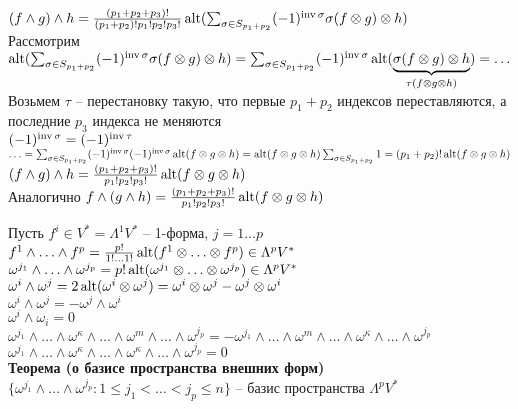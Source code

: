 \documentclass[12pt]{article}
\begin{document}
\begin{enumerate}
    $(f\land g) \land h = \frac{(p_1+p_2+p_3)!}{(p_1+p_2)!p_1!p_2!p_3!}\alt(\sum_{\sigma \in S_{p_1+p_2}} (-1)^{\inv\sigma}\sigma(f\otimes g)\otimes h)$\\
    Рассмотрим $\alt(\sum_{\sigma \in S_{p_1+p_2}} (-1)^{\inv\sigma}\sigma(f\otimes g)\otimes h) = \sum_{\sigma \in S_{p_1+p_2}} (-1)^{\inv\sigma}\alt(\ub{\tau(f\otimes g\otimes h)}{\sigma(f\otimes g)\otimes h}) = \ldots$\\
    Возьмем $\tau$ -- перестановку такую, что первые $p_1+p_2$ индексов переставляются, а последние $p_3$ индекса не меняются\\
    $(-1)^{\inv \sigma} = (-1)^{\inv \tau}$\\
    $\ldots = \sum_{\sigma \in S_{p_1+p_2}} (-1)^{\inv \sigma}(-1)^{\inv \sigma} \alt(f\otimes g \otimes h) = \alt(f\otimes g\otimes h)\sum_{\sigma \in S_{p_1+p_2}} 1 = (p_1+p_2)!\alt(f\otimes g \otimes h)$\\
    $(f\land g) \land h = \frac{(p_1+p_2+p_3)!}{p_1!p_2!p_3!}\alt(f\otimes g \otimes h)$\\
    Аналогично $f \land (g\land h) = \frac{(p_1+p_2+p_3)!}{p_1!p_2!p_3!}\alt(f\otimes g \otimes h)$
\end{enumerate}
Пусть $f^i \in V^* = \Lambda^1V^*$ -- 1-форма, $j = 1\ldots p$\\
$f^1\land \ldots \land f^p = \frac{p!}{1!\ldots1!} \alt(f^1\otimes \ldots \otimes f^p) \in \Lambda^p V^*$\\
$\omega^{j_1}\land \ldots \land \omega^{j_p} = p! \alt(\omega^{j_1}\otimes \ldots \otimes \omega^{j_p}) \in \Lambda^p V^*$\\
$\omega^i \land \omega^j = 2\alt(\omega^i \otimes \omega^j) = \omega^i\otimes \omega^j - \omega^j\otimes \omega^i$\\
$\omega^i\land \omega^j = -\omega^j\land \omega^i$\\
$\omega^i\land \omega_i = 0$\\
$\omega^{j_1}\land \ldots \land \omega^\kappa \land \ldots \land \omega^m \land \ldots \land \omega^{j_p} = -\omega^{j_1}\land \ldots \land \omega^m \land \ldots \land \omega^\kappa \land \ldots \land \omega^{j_p}$\\
$\omega^{j_1}\land \ldots \land \omega^\kappa \land \ldots \land \omega^\kappa \land \ldots \land \omega^{j_p} = 0$\\
\textbf{Теорема (о базисе пространства внешних форм)}\\
$\{ \omega^{j_1}\land \ldots \land \omega^{j_p}: 1 \leq j_1 < \ldots < j_p \leq n \}$ -- базис пространства $\Lambda^pV^*$\\
\end{document}
